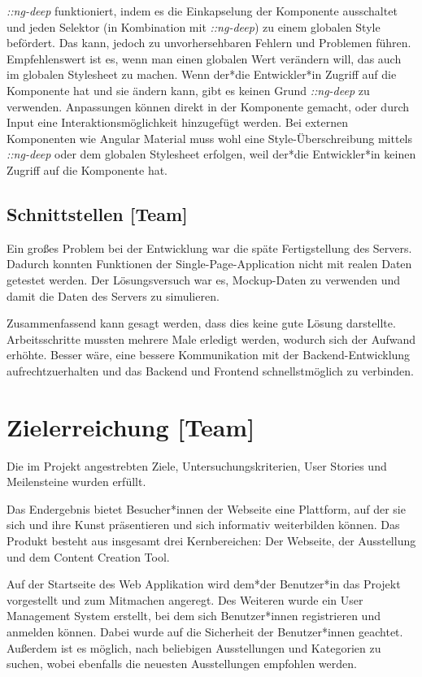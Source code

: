 \emph{::ng-deep} funktioniert, indem es die Einkapselung der Komponente ausschaltet und jeden Selektor (in Kombination mit \emph{::ng-deep}) zu einem globalen Style befördert. Das kann, jedoch zu unvorhersehbaren Fehlern und Problemen führen. Empfehlenswert ist es, wenn man einen globalen Wert verändern will, das auch im globalen Stylesheet zu machen.
Wenn der*die Entwickler*in Zugriff auf die Komponente hat und sie ändern kann, gibt es keinen Grund \emph{::ng-deep} zu verwenden. Anpassungen können direkt in der Komponente gemacht, oder durch Input eine Interaktionsmöglichkeit hinzugefügt werden. Bei externen Komponenten wie Angular Material muss wohl eine Style-Überschreibung mittels \emph{::ng-deep} oder dem globalen Stylesheet erfolgen, weil der*die Entwickler*in keinen Zugriff auf die Komponente hat. \cite{AngularComponentsStyleNgDEEP, UnderstandingNgDeep}

\subsection{Schnittstellen [Team]}
Ein großes Problem bei der Entwicklung war die späte Fertigstellung des Servers.
Dadurch konnten Funktionen der Single-Page-Application nicht mit realen Daten getestet werden. Der Lösungsversuch war es, Mockup-Daten zu verwenden und damit die Daten des Servers zu simulieren.  

Zusammenfassend kann gesagt werden, dass dies keine gute Lösung darstellte. Arbeitsschritte mussten mehrere Male erledigt werden, wodurch sich der Aufwand erhöhte. Besser wäre, eine bessere Kommunikation mit der Backend-Entwicklung aufrechtzuerhalten und das Backend und Frontend schnellstmöglich zu verbinden. 

\section{Zielerreichung [Team]}
Die im Projekt angestrebten Ziele, Untersuchungskriterien, User Stories und Meilensteine wurden erfüllt.

Das Endergebnis bietet Besucher*innen der Webseite eine Plattform, auf der sie sich und ihre Kunst präsentieren und sich informativ weiterbilden können. Das Produkt besteht aus insgesamt drei Kernbereichen: Der Webseite, der Ausstellung und dem Content Creation Tool.

Auf der Startseite des Web Applikation wird dem*der Benutzer*in das Projekt vorgestellt und zum Mitmachen angeregt. Des Weiteren wurde ein User Management System erstellt, bei dem sich Benutzer*innen registrieren und anmelden können. Dabei wurde auf die Sicherheit der Benutzer*innen geachtet. Außerdem ist es möglich, nach beliebigen Ausstellungen und Kategorien zu suchen, wobei ebenfalls die neuesten Ausstellungen empfohlen werden.

